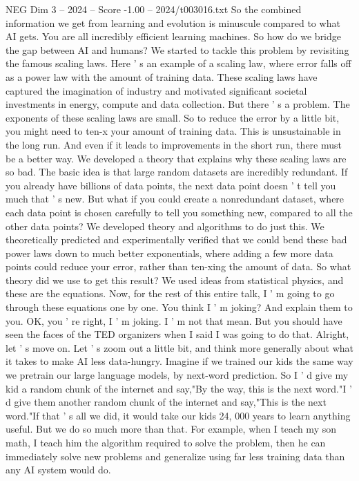 \begin{textsample}{NEG Dim 3 – 2024 – Score -1.00 – 2024/t003016.txt}
So the combined information we get from learning and evolution is minuscule compared to what AI gets.
You are all incredibly efficient learning machines.
So how do we bridge the gap between AI and humans?
We started to tackle this problem by revisiting the famous scaling laws.
Here ' s an example of a scaling law, where error falls off as a power law with the amount of training data.
These scaling laws have captured the imagination of industry and motivated significant societal investments in energy, compute and data collection.
But there ' s a problem.
The exponents of these scaling laws are small.
So to reduce the error by a little bit, you might need to ten-x your amount of training data.
This is unsustainable in the long run.
And even if it leads to improvements in the short run, there must be a better way.
We developed a theory that explains why these scaling laws are so bad.
The basic idea is that large random datasets are incredibly redundant.
If you already have billions of data points, the next data point doesn ' t tell you much that ' s new.
But what if you could create a nonredundant dataset, where each data point is chosen carefully to tell you something new, compared to all the other data points?
We developed theory and algorithms to do just this.
We theoretically predicted and experimentally verified that we could bend these bad power laws down to much better exponentials, where adding a few more data points could reduce your error, rather than ten-xing the amount of data.
So what theory did we use to get this result?
We used ideas from statistical physics, and these are the equations.
Now, for the rest of this entire talk, I ' m going to go through these equations one by one.
You think I ' m joking?
And explain them to you.
OK, you ' re right, I ' m joking.
I ' m not that mean.
But you should have seen the faces of the TED organizers when I said I was going to do that.
Alright, let ' s move on.
Let ' s zoom out a little bit, and think more generally about what it takes to make AI less data-hungry.
Imagine if we trained our kids the same way we pretrain our large language models, by next-word prediction.
So I ' d give my kid a random chunk of the internet and say,"By the way, this is the next word."I ' d give them another random chunk of the internet and say,"This is the next word."If that ' s all we did, it would take our kids 24, 000 years to learn anything useful.
But we do so much more than that.
For example, when I teach my son math, I teach him the algorithm required to solve the problem, then he can immediately solve new problems and generalize using far less training data than any AI system would do.

\end{textsample}
